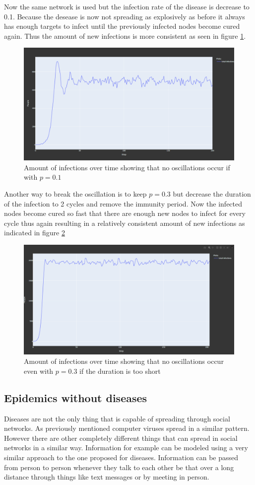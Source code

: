 Now the same network is used but the infection rate of the disease is decrease to 0.1.
Because the desease is now not spreading as explosively as before it always has enough targets
to infect until the previously infected nodes become cured again. Thus the amount of new 
infections is more consistent as seen in figure \ref{fig:no_oscillation}.

\begin{figure}
    \centering
    \includegraphics[width=0.5\linewidth]{images/no_oscillation.png}
    \caption{Amount of infections over time showing that no oscillations occur if with $p = 0.1$}
    \label{fig:no_oscillation}
\end{figure}

Another way to break the oscillation is to keep $p=0.3$ but decrease the duration of the infection to 2 cycles 
and remove the immunity period. Now the infected nodes become cured so fast that there are
enough new nodes to infect for every cycle thus again resulting in a relatively consistent
amount of new infections as indicated in figure \ref{fig:no_oscillation2}

\begin{figure}
    \centering
    \includegraphics[width=0.5\linewidth]{images/no_oscillation2.png}
    \caption{Amount of infections over time showing that no oscillations occur even with $p = 0.3$ if the duration is too short}
    \label{fig:no_oscillation2}
\end{figure}

\subsection{Epidemics without diseases}
Diseases are not the only thing that is capable of spreading through social networks. As
previously mentioned computer viruses spread in a similar pattern. However there are other
completely different things that can spread in social networks in a similar way.
Information for example can be modeled using a very similar approach to the one proposed
for diseases. Information can be passed from person to person whenever they talk to each other
be that over a long distance through things like text messages or by meeting in person.

